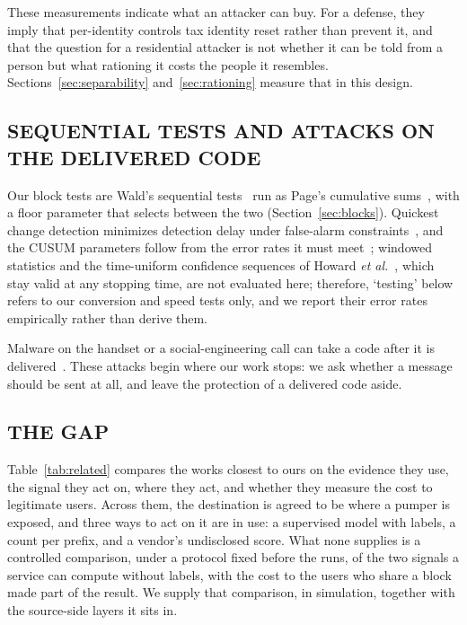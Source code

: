\documentclass{IEEEoj}
\begin{document}
These measurements indicate what an attacker can buy. For a defense, they imply that per-identity controls tax identity reset rather than prevent it, and that the question for a residential attacker is not whether it can be told from a person but what rationing it costs the people it resembles. Sections~\ref{sec:separability} and~\ref{sec:rationing} measure that in this design.

\subsection{SEQUENTIAL TESTS AND ATTACKS ON THE DELIVERED CODE}
\label{sec:codeattacks}
Our block tests are Wald's sequential tests~\cite{wald1945sprt} run as Page's cumulative sums~\cite{page1954cusum}, with a floor parameter that selects between the two (Section~\ref{sec:blocks}). Quickest change detection minimizes detection delay under false-alarm constraints~\cite{veeravalli2012qcd}, and the CUSUM parameters follow from the error rates it must meet~\cite{nist_cusum}; windowed statistics and the time-uniform confidence sequences of Howard \textit{et al.}~\cite{howard2021confseq}, which stay valid at any stopping time, are not evaluated here; therefore, `testing' below refers to our conversion and speed tests only, and we report their error rates empirically rather than derive them.

Malware on the handset or a social-engineering call can take a code after it is delivered~\cite{mulliner2013smsotp,siadati2017sms}. These attacks begin where our work stops: we ask whether a message should be sent at all, and leave the protection of a delivered code aside.

\subsection{THE GAP}
Table~\ref{tab:related} compares the works closest to ours on the evidence they use, the signal they act on, where they act, and whether they measure the cost to legitimate users. Across them, the destination is agreed to be where a pumper is exposed, and three ways to act on it are in use: a supervised model with labels, a count per prefix, and a vendor's undisclosed score. What none supplies is a controlled comparison, under a protocol fixed before the runs, of the two signals a service can compute without labels, with the cost to the users who share a block made part of the result. We supply that comparison, in simulation, together with the source-side layers it sits in.
\end{document}

